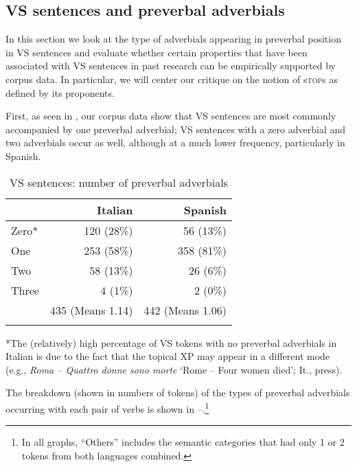 \documentclass[output=paper,colorlinks,citecolor=brown,
]{langscibook}
\begin{document}
\subsection{VS sentences and preverbal adverbials}

In this section we look at the type of adverbials appearing in preverbal position in VS sentences and evaluate whether certain properties that have been associated with VS sentences in past research can be empirically supported by corpus data. In particular, we will center our critique on the notion of s\textsc{top}s as defined by its proponents. 

First, as seen in , our corpus data show that VS sentences are most commonly accompanied by one preverbal adverbial; VS sentences with a zero adverbial and two adverbials occur as well, although at a much lower frequency, particularly in Spanish.  

\begin{table}
    \begin{tabular}{lrr}\lsptoprule
 & Italian & Spanish\\\midrule
   Zero* & 120 (28\%) & 56 (13\%)\\
     One & 253 (58\%) & 358 (81\%)\\
     Two & 58 (13\%) & 26 (6\%)\\
    Three & 4 (1\%) & 2 (0\%)\\
& 435 (Means 1.14) & 442 (Means 1.06)\\
    \lspbottomrule
    \end{tabular}
    \caption{VS sentences: number of preverbal adverbials}
    \footnotesize
    \justify
    *The (relatively) high percentage of VS tokens with no preverbal adverbials in Italian is due to the fact that the topical XP may appear in a different mode (e.g.,\textit{ Roma – Quattro donne sono morte} `Rome – Four women died'; It., press).	
    \label{tab:nishida:5}
\end{table}

The breakdown (shown in numbers of tokens) of the types of preverbal adverbials occurring with each pair of verbs is shown in --.\footnote{In all graphs, ``Others'' includes the semantic categories that had only 1 or 2 tokens from both languages combined.}

\begin{figure}
\begin{floatrow}
\quad
{}
\end{floatrow}
\end{figure}
\end{document}
